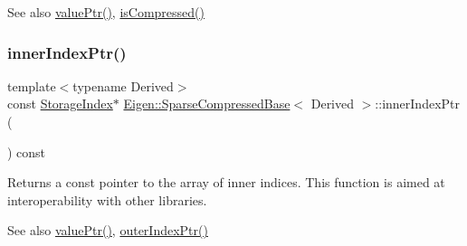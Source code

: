 \begin{DoxySeeAlso}{See also}
\mbox{\hyperlink{class_eigen_1_1_sparse_compressed_base_a0f12f72d14b6c277d09be9f5ce2eab95}{value\+Ptr()}}, \mbox{\hyperlink{class_eigen_1_1_sparse_compressed_base_a837934b33a80fe996ff20500373d3a61}{is\+Compressed()}} 
\end{DoxySeeAlso}
\mbox{\label{class_eigen_1_1_sparse_compressed_base_aa64818e1aa43015dad01b114b2ab4687}} 
\subsubsection{\texorpdfstring{innerIndexPtr()}{innerIndexPtr()}\hspace{0.1cm}{\footnotesize\ttfamily [1/2]}}
{\footnotesize\ttfamily template$<$typename Derived$>$ \\
const \mbox{\hyperlink{class_eigen_1_1_sparse_matrix_base_a0b540ba724726ebe953f8c0df06081ed}{Storage\+Index}}$\ast$ \mbox{\hyperlink{class_eigen_1_1_sparse_compressed_base}{Eigen\+::\+Sparse\+Compressed\+Base}}$<$ Derived $>$\+::inner\+Index\+Ptr (\begin{DoxyParamCaption}{ }\end{DoxyParamCaption}) const\hspace{0.3cm}{\ttfamily [inline]}}

\begin{DoxyReturn}{Returns}
a const pointer to the array of inner indices. This function is aimed at interoperability with other libraries. 
\end{DoxyReturn}
\begin{DoxySeeAlso}{See also}
\mbox{\hyperlink{class_eigen_1_1_sparse_compressed_base_a0f12f72d14b6c277d09be9f5ce2eab95}{value\+Ptr()}}, \mbox{\hyperlink{class_eigen_1_1_sparse_compressed_base_a53a82f962686e18c8dc07a4b9a85ed7b}{outer\+Index\+Ptr()}} 
\end{DoxySeeAlso}
\mbox{\label{class_eigen_1_1_sparse_compressed_base_a197111c1289644f1ea38fe683ccdd82a}} 
